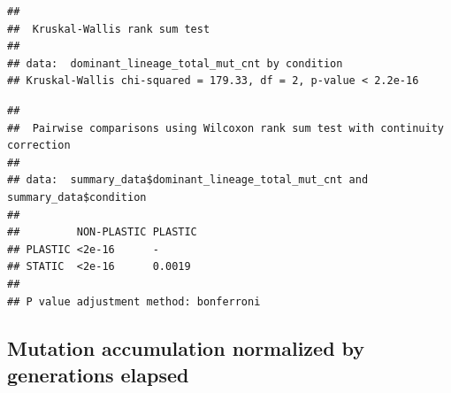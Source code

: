 \documentclass[]{book}
\newenvironment{Shaded}{\begin{snugshade}}{\end{snugshade}}
\newcommand{\DataTypeTok}[1]{\textcolor[rgb]{0.13,0.29,0.53}{#1}}
\newcommand{\KeywordTok}[1]{\textcolor[rgb]{0.13,0.29,0.53}{\textbf{#1}}}
\newcommand{\NormalTok}[1]{#1}
\newcommand{\OperatorTok}[1]{\textcolor[rgb]{0.81,0.36,0.00}{\textbf{#1}}}
\newcommand{\StringTok}[1]{\textcolor[rgb]{0.31,0.60,0.02}{#1}}
\begin{document}
\begin{verbatim}
## 
##  Kruskal-Wallis rank sum test
## 
## data:  dominant_lineage_total_mut_cnt by condition
## Kruskal-Wallis chi-squared = 179.33, df = 2, p-value < 2.2e-16
\end{verbatim}

\begin{Shaded}
\end{Shaded}

\begin{verbatim}
## 
##  Pairwise comparisons using Wilcoxon rank sum test with continuity correction 
## 
## data:  summary_data$dominant_lineage_total_mut_cnt and summary_data$condition 
## 
##         NON-PLASTIC PLASTIC
## PLASTIC <2e-16      -      
## STATIC  <2e-16      0.0019 
## 
## P value adjustment method: bonferroni
\end{verbatim}

\hypertarget{mutation-accumulation-normalized-by-generations-elapsed}{%
\subsection{Mutation accumulation normalized by generations elapsed}\label{mutation-accumulation-normalized-by-generations-elapsed}}
\end{document}
